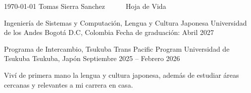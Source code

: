 \documentclass[11pt, a4paper]{awesome-cv}
\begin{document}
\makecvheader[C]

\makecvfooter
  {\today}
  {Tomas Sierra Sanchez~~~\textperiodcentered~~~Hoja de Vida}
  {\thepage}


\begin{cventries}

  \cventry
    {Ingenier\'ia de Sistemas y Computaci\'on, Lengua y Cultura Japonesa}
    {Universidad de los Andes}
    {Bogot\'a D.C, Colombia}
    {Fecha de graduaci\'on: Abril 2027}
    {}

  \cventry
    {Programa de Intercambio, Tsukuba Trans Pacific Program}
    {Universidad de Tsukuba}
    {Tsukuba, Jap\'on}
    {Septiembre 2025 -- Febrero 2026}
    {
      \begin{cvitems}
        \item {Viv\'i de primera mano la lengua y cultura japonesa, adem\'as de estudiar \'areas cercanas y relevantes a mi carrera en casa.}
      \end{cvitems}
    }

\end{cventries}

\end{document}
